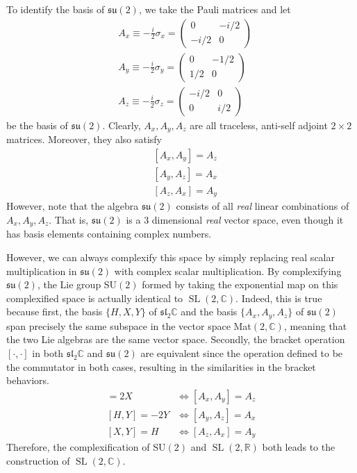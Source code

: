 \documentclass{article}
\DeclareMathOperator{\SL}{SL}
\begin{document}
      To identify the basis of $\mathfrak{su}(2)$, we take the Pauli matrices and let 
      \begin{align*}
        & A_x \equiv - \frac{i}{2} \sigma_x = \begin{pmatrix} 0&-i/2\\-i/2&0 \end{pmatrix} \\
        & A_y \equiv - \frac{i}{2} \sigma_y = \begin{pmatrix}0&-1/2\\1/2&0\end{pmatrix} \\
        & A_z \equiv -\frac{i}{2} \sigma_z = \begin{pmatrix}-i/2&0\\0&i/2\end{pmatrix}
      \end{align*} 
      be the basis of $\mathfrak{su}(2)$. Clearly, $A_x, A_y, A_z$ are all traceless, anti-self adjoint $2 \times 2$ matrices. Moreover, they also satisfy
      \begin{align*}
        & [A_x, A_y] = A_z \\
        & [A_y, A_z] = A_x \\
        & [A_z, A_x] = A_y
      \end{align*}
      However, note that the algebra $\mathfrak{su}(2)$ consists of all \textit{real} linear combinations of $A_x, A_y, A_z$. That is, $\mathfrak{su}(2)$ is a 3 dimensional \textit{real} vector space, even though it has basis elements containing complex numbers. 

      However, we can always complexify this space by simply replacing real scalar multiplication in $\mathfrak{su}(2)$ with complex scalar multiplication. By complexifying $\mathfrak{su}(2)$, the Lie group SU$(2)$ formed by taking the exponential map on this complexified space is actually identical to $\SL(2, \mathbb{C})$. Indeed, this is true because first, the basis $\{H, X, Y\}$ of $\mathfrak{sl}_2 \mathbb{C}$ and the basis $\{A_x, A_y, A_z\}$ of $\mathfrak{su}(2)$ span precisely the same subspace in the vector space Mat$(2, \mathbb{C})$, meaning that the two Lie algebras are the same vector space. Secondly, the bracket operation $[\cdot, \cdot]$ in both $\mathfrak{sl}_2 \mathbb{C}$ and $\mathfrak{su}(2)$ are equivalent since the operation defined to be the commutator in both cases, resulting in the similarities in the bracket behaviors. 
      \begin{align*}
        [H,X] = 2X & \iff [A_x, A_y] = A_z \\
        [H,Y] = - 2Y & \iff [A_y, A_z] = A_x\\
        [X,Y] = H & \iff  [A_z, A_x] = A_y 
      \end{align*}
      Therefore, the complexification of SU$(2)$ and $\SL(2, \mathbb{R})$ both leads to the construction of $\SL(2, \mathbb{C})$. 
\end{document}

